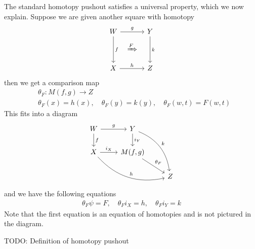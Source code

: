 \documentclass{scrartcl}
\theoremstyle{plain}
\theoremstyle{definition}
\newtheorem{definition}[theorem]{Definition}
\DeclareMathOperator{\Hom}{Hom}
\begin{document}
The standard homotopy pushout satisfies a universal property, which we now explain. Suppose we are given another square with homotopy
\begin{equation}\label{diag:square_with_homotopy}
    \begin{tikzcd}[column sep=.2cm, row sep=.2cm]
        W \arrow[rr,"g"]\arrow[dd,"f"] && Y \arrow[dd, "k"] \\
        & \xRightarrow{F} & \\
        X \arrow[rr, "h"] && Z
    \end{tikzcd}
\end{equation}
then we get a comparison map 
\begin{align*}
    &\theta_F\colon M(f,g)\to Z \\
    &\theta_F(x) = h(x), \quad \theta_F(y) = k(y), \quad \theta_F(w, t) = F(w, t)
\end{align*}
This fits into a diagram
\begin{equation}
    \begin{tikzcd}
    W \ar[r, "g"] \ar[d, "f"]  &  Y \ar[d, "i_Y"] \ar[ddr, bend left, "k"]  & \\
    X \ar[r, "i_X"] \ar[drr, bend right, "h"]  &  M(f, g) \ar[dr, "\theta_F"]  &  \\
    &  &  Z
\end{tikzcd}
\end{equation}
and we have the following equations
\begin{align*}
    \theta_F \psi = F, \quad \theta_F i_X = h, \quad \theta_F i_Y = k
\end{align*}
Note that the first equation is an equation of homotopies and is not pictured in the diagram. 

TODO: Definition of homotopy pushout
\end{document}
